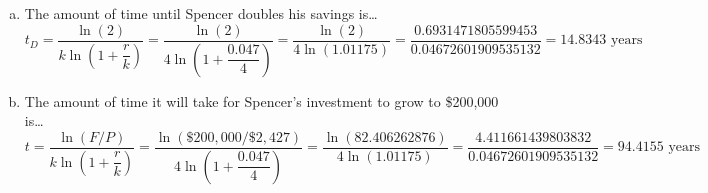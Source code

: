 \documentclass[11pt,letterpaper]{article}
\begin{document}
\begin{enumerate}[(a)]
\item The amount of time until Spencer doubles his savings is\dots
	\[
	t_D= \dfrac{\ln(2)}{k \ln \left(1 + \dfrac{r}{k} \right)}= \dfrac{\ln(2)}{4 \ln \left(1 + \dfrac{0.047}{4} \right)}= \dfrac{\ln(2)}{4 \ln(1.01175)}= \dfrac{0.6931471805599453}{0.04672601909535132}= 14.8343 \text{ years}
	\] \pspace

\item The amount of time it will take for Spencer's investment to grow to \$200,000 is\dots
	\[
	t= \dfrac{\ln(F/P)}{k \ln \left(1 + \dfrac{r}{k} \right)}= \dfrac{\ln(\$200,\!000/\$2,\!427)}{4 \ln \left(1 + \dfrac{0.047}{4} \right)}= \dfrac{\ln(82.406262876)}{4 \ln(1.01175)}= \dfrac{4.411661439803832}{0.04672601909535132}= 94.4155 \text{ years}
	\]
\end{enumerate}
\end{document}
